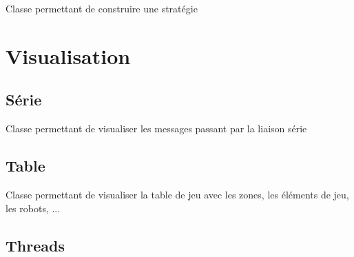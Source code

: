 \documentclass[letterpaper,10pt,french]{sphinxmanual}
\begin{document}
\begin{fulllineitems}
\label{strategie:lib.strategie.Strategie}
Classe permettant de construire une stratégie

\end{fulllineitems}



\chapter{Visualisation}
\label{visualisation::doc}\label{visualisation:visualisation}

\section{Série}
\label{visualisation:serie}\label{visualisation:module-lib.visualisation.visu_serie}

\begin{fulllineitems}
\label{visualisation:lib.visualisation.visu_serie.Visu_serie}
Classe permettant de visualiser les messages passant par la liaison série

\end{fulllineitems}



\section{Table}
\label{visualisation:table}\label{visualisation:module-lib.visualisation.visu_table}

\begin{fulllineitems}
\label{visualisation:lib.visualisation.visu_table.Visu_table}
Classe permettant de visualiser la table de jeu avec les zones, les éléments de jeu, les robots, ...

\end{fulllineitems}



\section{Threads}
\label{visualisation:module-lib.visualisation.visu_threads}\label{visualisation:threads}
\end{document}
